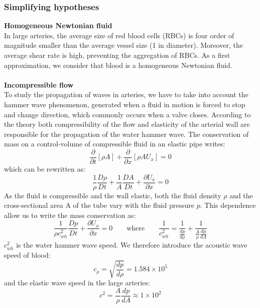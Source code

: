 \documentclass[12pt,a4paper]{article}
\numberwithin{equation}{section}
\begin{document}
\subsubsection{Simplifying hypotheses}
{\bf Homogeneous Newtonian fluid}\\
In large arteries, the average size of red blood cells (RBCs) is four order of magnitude smaller than the average vessel size (1 in diameter). Moreover, the average shear rate is high, preventing the aggregation of RBCs. As a first approximation,
we consider that blood is a homogeneous Newtonian fluid.\\
\\
{\bf Incompressible flow}\\
To study the propagation of waves in arteries, we have to take into account the hammer wave phenomenon, generated when a fluid in motion is forced to stop and change direction, which commonly occurs when a valve closes. According to the theory both compressibility of the flow and elasticity of the arterial wall are responsible for the propagation of the water hammer wave. The conservation of mass on a control-volume of compressible fluid in an elastic pipe writes:
\begin{equation}
\frac{\partial}{\partial t}[\rho A]+\frac{\partial}{\partial x}[\rho A U_x] = 0
\end{equation}
which can be rewritten as:
\begin{equation}
\frac{1}{\rho}\frac{D\rho}{Dt}+\frac{1}{A}\frac{DA}{Dt} + \frac{\partial U_x}{\partial x} = 0
\end{equation}
As the fluid is compressible and the wall elastic, both the fluid density $\rho$ and the cross-sectional area A of the tube vary with the fluid pressure $p$. This dependence allow us to write the mass conservation as:
\begin{equation} \label{eq:hammer wave velocity}
\frac{1}{\rho c_{wh}^2}\frac{Dp}{Dt}+\frac{\partial U_x}{\partial x} = 0 \qquad \textrm{where} \qquad \frac{1}{c_{wh}^2} = \frac{1}{\frac{dp}{d\rho}} +\frac{1}{\frac{A}{\rho}\frac{dp}{dA}}
\end{equation}
$c_{wh}^2$ is the water hammer wave speed. We therefore introduce the acoustic wave speed of blood:
\begin{equation}
c_{\rho} = \sqrt{\frac{dp}{d\rho}} = 1.584\times 10^5
\end{equation}
and the elastic wave speed in the large arteries:
\begin{equation} \label{eq:elastic speed wave}
c^2 = \frac{A}{\rho}\frac{dp}{dA} \approx 1 \times 10^2
\end{equation}
\end{document}
